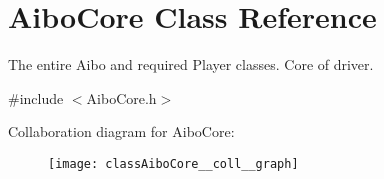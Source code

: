 \hypertarget{classAiboCore}{
\section{AiboCore Class Reference}
\label{classAiboCore}
}


The entire Aibo and required Player classes. Core of driver.  




{\ttfamily \#include $<$AiboCore.h$>$}



Collaboration diagram for AiboCore:\nopagebreak
\begin{figure}[H]
\begin{center}
\leavevmode
\texttt{[image: classAiboCore\_\_coll\_\_graph]}
\end{center}
\end{figure}
